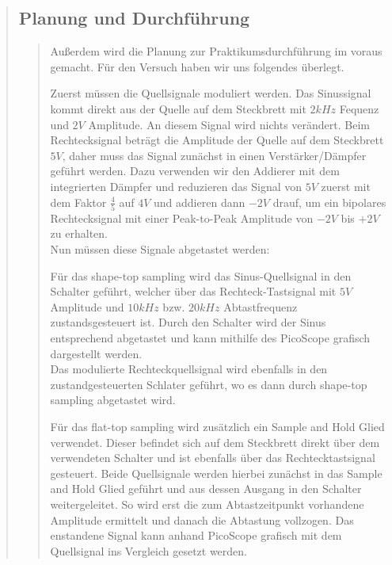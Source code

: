 \begin{quote}
\begin{quote}
        
    \end{quote}  %
    
    \subsection{Planung und Durchführung}
    \begin{quote}
        Außerdem wird die Planung zur Praktikumsdurchführung im voraus gemacht. Für
        den Versuch haben wir uns folgendes überlegt.\\
        
        Zuerst müssen die Quellsignale moduliert werden. Das Sinussignal
        kommt direkt aus der Quelle auf dem Steckbrett mit $2 kHz$ Fequenz und
        $2V$ Amplitude. An diesem Signal wird nichts verändert. Beim
        Rechtecksignal beträgt die Amplitude der Quelle auf dem Steckbrett $5V$, daher 
        muss das Signal zunächst in einen Verstärker/Dämpfer geführt werden.
        Dazu verwenden wir den Addierer mit dem integrierten Dämpfer und
        reduzieren das Signal von $5V$ zuerst mit dem Faktor $\frac{4}{5}$ auf $4V$ und addieren dann $-2V$ drauf, um
        ein bipolares Rechtecksignal mit einer Peak-to-Peak Amplitude von $-2V$
        bis $+2V$ zu erhalten.\\
        Nun müssen diese Signale abgetastet werden:
        
        Für das shape-top sampling wird das Sinus-Quellsignal in den
        Schalter geführt, welcher über das Rechteck-Tastsignal mit $5V$ Amplitude und $10 kHz$ bzw. $20 kHz$
        Abtastfrequenz zustandsgesteuert ist. Durch den Schalter wird der Sinus
        entsprechend abgetastet und kann mithilfe des PicoScope grafisch
        dargestellt werden.\\ 
        Das modulierte Rechteckquellsignal wird ebenfalls in den
        zustandgesteuerten Schlater geführt, wo es dann durch shape-top sampling
        abgetastet wird. 
        
        \vspace{0.5em}
        
        Für das flat-top sampling wird zusätzlich ein Sample and Hold Glied
        verwendet. Dieser befindet sich auf dem Steckbrett direkt über dem
        verwendeten Schalter und ist ebenfalls über das Rechtecktastsignal
        gesteuert. Beide Quellsignale werden hierbei zunächst in das Sample and
        Hold Glied geführt und aus dessen Ausgang in den Schalter
        weitergeleitet. So wird erst die zum Abtastzeitpunkt vorhandene
        Amplitude ermittelt und danach die Abtastung vollzogen. Das enstandene
        Signal kann anhand PicoScope grafisch mit dem Quellsignal ins Vergleich gesetzt
        werden.
        

\end{quote}
\end{quote}
